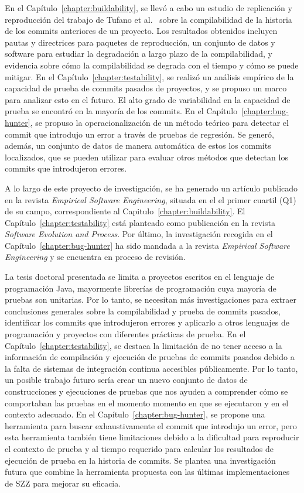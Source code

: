 En el Capítulo~\ref{chapter:buildability}, se llevó a cabo un estudio de replicación y reproducción del trabajo de Tufano et al.~\cite{tufano2017there} sobre la compilabilidad de la historia de los commits anteriores de un proyecto. Los resultados obtenidos incluyen pautas y directrices para paquetes de reproducción, un conjunto de datos y software para estudiar la degradación a largo plazo de la compilabilidad, y evidencia sobre cómo la compilabilidad se degrada con el tiempo y cómo se puede mitigar. 
En el Capítulo~\ref{chapter:testability}, se realizó un análisis empírico de la capacidad de prueba de commits pasados de proyectos, y se propuso un marco para analizar esto en el futuro. El alto grado de variabilidad en la capacidad de prueba se encontró en la mayoría de los commits. 
En el Capítulo~\ref{chapter:bug-hunter}, se propuso la operacionalización de un método teórico para detectar el commit que introdujo un error a través de pruebas de regresión. 
Se generó, además, un conjunto de datos de manera automática de estos los commits localizados, que se pueden utilizar para evaluar otros métodos que detectan los commits que introdujeron errores.

A lo largo de este proyecto de investigación, se ha generado un artículo publicado en la revista \textit{Empirical Software Engineering}, situada en el el primer cuartil (Q1) de su campo, correspondiente al Capitulo~\ref{chapter:buildability}. 
El Capítulo~\ref{chapter:testability} está planteado como publicación en la revista \textit{Software Evolution and Process}. 
Por último, la investigación recogida en el Capítulo~\ref{chapter:bug-hunter} ha sido mandada a la revista \textit{Empirical Software Engineering} y se encuentra en proceso de revisión.

La tesis doctoral presentada se limita a proyectos escritos en el lenguaje de programación Java, mayormente librerías de programación cuya mayoría de pruebas son unitarias. Por lo tanto, se necesitan más investigaciones para extraer conclusiones generales sobre la compilabilidad y prueba de commits pasados, identificar los commits que introdujeron errores y aplicarlo a otros lenguajes de programación y proyectos con diferentes prácticas de prueba. En el Capítulo~\ref{chapter:testability}, se destaca la limitación de no tener acceso a la información de compilación y ejecución de pruebas de commits pasados debido a la falta de sistemas de integración continua accesibles públicamente. 
Por lo tanto, un posible trabajo futuro sería crear un nuevo conjunto de datos de construcciones y ejecuciones de pruebas que nos ayuden a comprender cómo se comportaban las pruebas en el momento momento en que se ejecutaron y en el contexto adecuado.
En el Capítulo~\ref{chapter:bug-hunter}, se propone una herramienta para buscar exhaustivamente el commit que introdujo un error, pero esta herramienta también tiene limitaciones debido a la dificultad para reproducir el contexto de prueba y al tiempo requerido para calcular los resultados de ejecución de prueba en la historia de commits. Se plantea una investigación futura que combine la herramienta propuesta con las últimas implementaciones de SZZ para mejorar su eficacia.